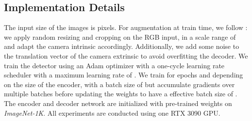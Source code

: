 \documentclass[10pt,twocolumn,letterpaper]{article}
\begin{document}
{

\subsection{Implementation Details}
The input size of the images is  pixels. For augmentation at train time, we follow \cite{harley2022simple, hou2021multiview}: we apply random resizing and cropping on the RGB input, in a scale range of  and adapt the camera intrinsic  accordingly. Additionally, we add some noise to the translation vector  of the camera extrinsic to avoid overfitting the decoder. 
We train the detector using an Adam optimizer with a one-cycle learning rate scheduler with a maximum learning rate of . We train for  epochs and depending on the size of the encoder, with a batch size of  but accumulate gradients over multiple batches before updating the weights to have a effective batch size of . The encoder and decoder network are initialized with pre-trained weights on \textit{ImageNet-1K}.
All experiments are conducted using one RTX 3090 GPU.


}
\end{document}
